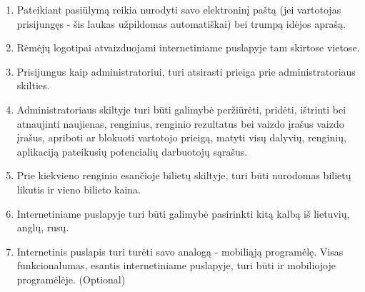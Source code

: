 \documentclass{VUMIFPSkursinis}
\begin{document}
\begin{enumerate}
			\item Pateikiant pasiūlymą reikia nurodyti savo elektroninį paštą (jei vartotojas prisijungęs - šis laukas užpildomas automatiškai) bei trumpą idėjos aprašą.
			\item Rėmėjų logotipai atvaizduojami internetiniame puslapyje tam skirtose vietose.
			\item Prisijungus kaip administratoriui, turi atsirasti prieiga prie administratoriaus skilties.
			\item Administratoriaus skiltyje turi būti galimybė peržiūrėti, pridėti, ištrinti bei atnaujinti naujienas, renginius, renginio rezultatus bei vaizdo įrašus vaizdo įrašus, apriboti ar blokuoti vartotojo prieigą, matyti visų dalyvių, renginių, aplikaciją pateikusių potencialių darbuotojų sąrašus.
			\item Prie kiekvieno renginio esančioje bilietų skiltyje, turi būti nurodomas bilietų likutis ir vieno bilieto kaina.
			\item Internetiniame puslapyje turi būti galimybė pasirinkti kitą kalbą iš lietuvių, anglų, rusų.
			\item Internetinis puslapis turi turėti savo analogą - mobiliąją programėlę. Visas funkcionalumas, esantis internetiniame puslapyje, turi būti ir mobiliojoje programėlėje. (Optional)
		\end{enumerate}
\end{document}
